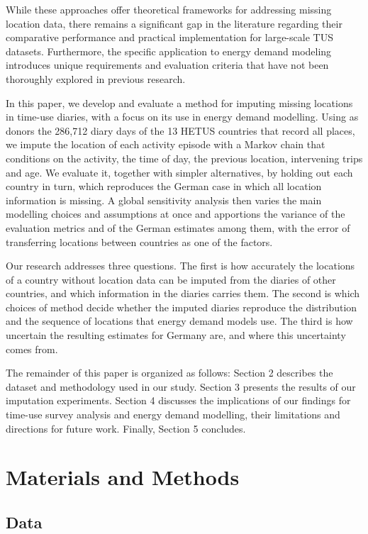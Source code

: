 \documentclass[a4paper]{article}
\begin{document}
While these approaches offer theoretical frameworks for addressing missing location data, there remains a significant gap in the literature regarding their comparative performance and practical implementation for large-scale TUS datasets. Furthermore, the specific application to energy demand modeling introduces unique requirements and evaluation criteria that have not been thoroughly explored in previous research.

In this paper, we develop and evaluate a method for imputing missing locations in time-use diaries, with a focus on its use in energy demand modelling. Using as donors the 286,712 diary days of the 13 HETUS countries that record all places, we impute the location of each activity episode with a Markov chain that conditions on the activity, the time of day, the previous location, intervening trips and age. We evaluate it, together with simpler alternatives, by holding out each country in turn, which reproduces the German case in which all location information is missing. A global sensitivity analysis \parencite{saltelliGlobalSensitivityAnalysis2008b} then varies the main modelling choices and assumptions at once and apportions the variance of the evaluation metrics and of the German estimates among them, with the error of transferring locations between countries as one of the factors.

Our research addresses three questions. The first is how accurately the locations of a country without location data can be imputed from the diaries of other countries, and which information in the diaries carries them. The second is which choices of method decide whether the imputed diaries reproduce the distribution and the sequence of locations that energy demand models use. The third is how uncertain the resulting estimates for Germany are, and where this uncertainty comes from.

The remainder of this paper is organized as follows: Section 2 describes the dataset and methodology used in our study. Section 3 presents the results of our imputation experiments. Section 4 discusses the implications of our findings for time-use survey analysis and energy demand modelling, their limitations and directions for future work. Finally, Section 5 concludes.

\section{Materials and Methods}

\subsection{Data}
\label{sec:data}
\end{document}
